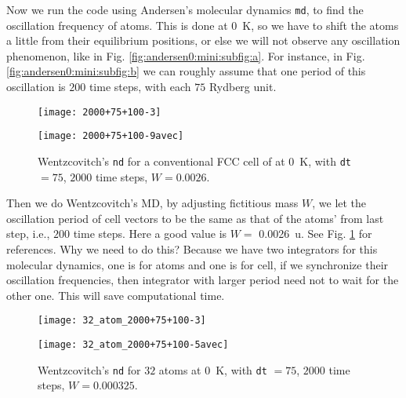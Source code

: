 Now we run the code using Andersen's molecular dynamics \texttt{md}, to find the oscillation frequency of atoms. This is done at \SI{0}{\kelvin}, so we have to shift the atoms a little from their equilibrium
positions, or else we will not observe any oscillation phenomenon, like in Fig. \ref{fig:andersen0:mini:subfig:a}.
For instance, in Fig. \ref{fig:andersen0:mini:subfig:b} we can roughly assume that
one period of this oscillation is $200$ time steps, with each $75$ Rydberg unit.

\begin{figure}[H]
	\centering
	\begin{minipage}[t]{.48\linewidth}
		\centering
		\texttt{[image: 2000+75+100-3]}
		\label{fig:adjust:a}
	\end{minipage}%
	\hfill
	\begin{minipage}[t]{.48\linewidth}
		\centering
		\texttt{[image: 2000+75+100-9avec]}
		\label{fig:adjust:b}
	\end{minipage}
	\caption{Wentzcovitch's \texttt{nd} for a conventional FCC cell of  at \SI{0}{\kelvin},
		with \texttt{dt} $= 75$, $2000$ time steps, $W = 0.0026$.}
	\label{fig:adjust}
\end{figure}

Then we do Wentzcovitch's MD, by adjusting fictitious mass $W$, we let the oscillation
period of cell vectors to be the same as that of the atoms' from last step, i.e., $200$ time
steps. Here a good value is $W = $ \SI{0.0026}{\atomicmassunit}. See Fig. \ref{fig:adjust} for references. Why we need to do this? Because we have two integrators for this molecular dynamics,
one is for atoms and one is for cell, if we synchronize their oscillation frequencies, then
integrator with larger period need not to wait for the other one. This will save computational
time.

\begin{figure}[H]
  \centering
  \begin{minipage}[t]{.48\linewidth}
    \centering
    \texttt{[image: 32\_atom\_2000+75+100-3]}
    \label{fig:32atom:a}
  \end{minipage}%
  \hfill
  \begin{minipage}[t]{.48\linewidth}
    \centering
    \texttt{[image: 32\_atom\_2000+75+100-5avec]}
    \label{fig:32atom:b}
  \end{minipage}
  \caption{Wentzcovitch's \texttt{nd} for $32$  atoms at \SI{0}{\kelvin},
    with \texttt{dt} $= 75$, $2000$ time steps, $W = 0.000325$.}
  \label{fig:32atom}
\end{figure}

